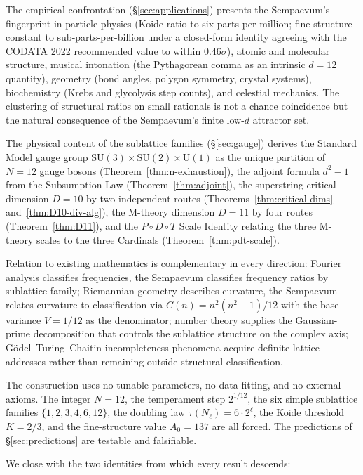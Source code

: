 \documentclass[11pt,a4paper]{article}
\theoremstyle{definition}
\theoremstyle{remark}
\begin{document}
The empirical confrontation (\S\ref{sec:applications}) presents the Sempaevum's fingerprint in particle physics (Koide ratio to six parts per million; fine-structure constant to sub-parts-per-billion under a closed-form identity agreeing with the CODATA 2022 recommended value to within $0.46\sigma$), atomic and molecular structure, musical intonation (the Pythagorean comma as an intrinsic $d=12$ quantity), geometry (bond angles, polygon symmetry, crystal systems), biochemistry (Krebs and glycolysis step counts), and celestial mechanics. The clustering of structural ratios on small rationals is not a chance coincidence but the natural consequence of the Sempaevum's finite low-$d$ attractor set.

The physical content of the sublattice families (\S\ref{sec:gauge}) derives the Standard Model gauge group $\mathrm{SU}(3)\times\mathrm{SU}(2)\times\mathrm{U}(1)$ as the unique partition of $N = 12$ gauge bosons (Theorem~\ref{thm:n-exhaustion}), the adjoint formula $d^{2}-1$ from the Subsumption Law (Theorem~\ref{thm:adjoint}), the superstring critical dimension $D = 10$ by two independent routes (Theorems~\ref{thm:critical-dims} and~\ref{thm:D10-div-alg}), the M-theory dimension $D = 11$ by four routes (Theorem~\ref{thm:D11}), and the $P{\circ}D{\circ}T$ Scale Identity relating the three M-theory scales to the three Cardinals (Theorem~\ref{thm:pdt-scale}).

Relation to existing mathematics is complementary in every direction: Fourier analysis classifies frequencies, the Sempaevum classifies frequency ratios by sublattice family; Riemannian geometry describes curvature, the Sempaevum relates curvature to classification via $C(n)=n^{2}(n^{2}-1)/12$ with the base variance $V=1/12$ as the denominator; number theory supplies the Gaussian-prime decomposition that controls the sublattice structure on the complex axis; G\"odel--Turing--Chaitin incompleteness phenomena acquire definite lattice addresses rather than remaining outside structural classification.

The construction uses no tunable parameters, no data-fitting, and no external axioms. The integer $N=12$, the temperament step $2^{1/12}$, the six simple sublattice families $\{1,2,3,4,6,12\}$, the doubling law $\tau(N_{\ell})=6\cdot 2^{\ell}$, the Koide threshold $K=2/3$, and the fine-structure value $A_{0}=137$ are all forced. The predictions of \S\ref{sec:predictions} are testable and falsifiable.

We close with the two identities from which every result descends:
\end{document}
